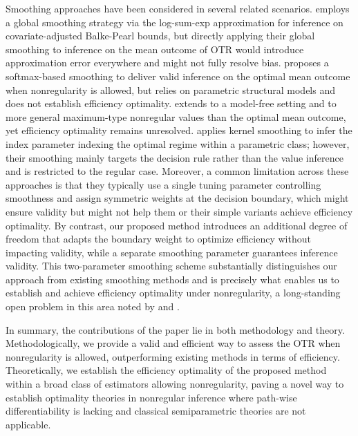 \documentclass[11pt]{article}
\theoremstyle{referenceplain}
\theoremstyle{referencedefinition}
\theoremstyle{referenceremark}
\begin{document}
Smoothing approaches have been considered in several related scenarios. \citet{levis2025covariate} employs a global smoothing strategy via the log-sum-exp approximation for inference on covariate-adjusted Balke-Pearl bounds, but directly applying their global smoothing to inference on the mean outcome of OTR would introduce approximation error everywhere and might not fully resolve bias. \citet{chen2023inference} proposes a softmax-based smoothing to deliver valid inference on the optimal mean outcome when nonregularity is allowed, but relies on parametric structural models and does not establish efficiency optimality. \citet{whitehouse2025inference} extends \citet{chen2023inference} to a model-free setting and to more general maximum-type nonregular values than the optimal mean outcome, yet efficiency optimality remains unresolved. \citet{wu2021resampling} applies kernel smoothing to infer the index parameter indexing the optimal regime within a parametric class; however, their smoothing mainly targets the decision rule rather than the value inference and is restricted to the regular case. Moreover, a common limitation across these approaches is that they typically use a single tuning parameter controlling smoothness and assign symmetric weights at the decision boundary, which might ensure validity but might not help them or their simple variants achieve efficiency optimality. By contrast, our proposed method introduces an additional degree of freedom that adapts the boundary weight to optimize efficiency without impacting validity, while a separate smoothing parameter guarantees inference validity. This two-parameter smoothing scheme substantially distinguishes our approach from existing smoothing methods and is precisely what enables us to establish and achieve efficiency optimality under nonregularity, a long-standing open problem in this area noted by \citet{van2011targeted} and \citet{whitehouse2025inference}.


In summary, the contributions of the paper lie in both methodology and theory. Methodologically, we provide a valid and efficient way to assess the OTR when nonregularity is allowed, outperforming existing methods in terms of efficiency. Theoretically, we establish the efficiency optimality of the proposed method within a broad class of estimators allowing nonregularity, paving a novel way to establish optimality theories in nonregular inference where path-wise differentiability is lacking and classical semiparametric theories are not applicable. 
\end{document}

